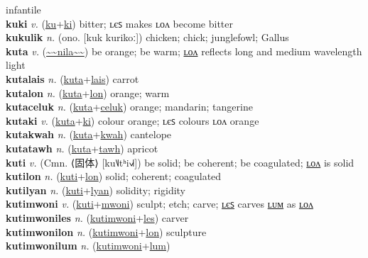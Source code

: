 infantile \label{kukamak} \\
\textbf{kuki} \textit{v.} (\hyperref[ku]{ku}+\hyperref[ki]{ki})
bitter; ʟєꜱ makes ʟᴏᴧ become bitter \label{kuki} \\
\textbf{kukulik} \textit{n.} (ono. [kuk kurikoː])
chicken; chick; junglefowl; Gallus \label{kukulik} \\
\textbf{kuta} \textit{v.} (\hyperref[nila]{\~{}\~{}nila\~{}\~{}})
be orange; be warm; \hyperref[kutalon]{ʟᴏᴧ} reflects long and medium wavelength light \label{kuta} \\
\textbf{kutalais} \textit{n.} (\hyperref[kuta]{kuta}+\hyperref[lais]{lais})
carrot \label{kutalais} \\
\textbf{kutalon} \textit{n.} (\hyperref[kuta]{kuta}+\hyperref[lon]{lon})
orange; warm \label{kutalon} \\
\textbf{kutaceluk} \textit{n.} (\hyperref[kuta]{kuta}+\hyperref[celuk]{celuk})
orange; mandarin; tangerine \label{kutaceluk} \\
\textbf{kutaki} \textit{v.} (\hyperref[kuta]{kuta}+\hyperref[ki]{ki})
colour orange; ʟєꜱ colours ʟᴏᴧ orange \label{kutaki} \\
\textbf{kutakwah} \textit{n.} (\hyperref[kuta]{kuta}+\hyperref[kwah]{kwah})
cantelope \label{kutakwah} \\
\textbf{kutatawh} \textit{n.} (\hyperref[kuta]{kuta}+\hyperref[tawh]{tawh})
apricot \label{kutatawh} \\
\textbf{kuti} \textit{v.} (Cmn. ⟨固体⟩ [ku˥˩tʰi˧˩˧])
be solid; be coherent; be coagulated; \hyperref[kutilon]{ʟᴏᴧ} is solid \label{kuti} \\
\textbf{kutilon} \textit{n.} (\hyperref[kuti]{kuti}+\hyperref[lon]{lon})
solid; coherent; coagulated \label{kutilon} \\
\textbf{kutilyan} \textit{n.} (\hyperref[kuti]{kuti}+\hyperref[lyan]{lyan})
solidity; rigidity \label{kutilyan} \\
\textbf{kutimwoni} \textit{v.} (\hyperref[kuti]{kuti}+\hyperref[mwoni]{mwoni})
sculpt; etch; carve; \hyperref[kutimwoniles]{ʟєꜱ} carves \hyperref[kutimwonilum]{ʟᴜᴍ} as \hyperref[kutimwonilon]{ʟᴏᴧ} \label{kutimwoni} \\
\textbf{kutimwoniles} \textit{n.} (\hyperref[kutimwoni]{kutimwoni}+\hyperref[les]{les})
carver \label{kutimwoniles} \\
\textbf{kutimwonilon} \textit{n.} (\hyperref[kutimwoni]{kutimwoni}+\hyperref[lon]{lon})
sculpture \label{kutimwonilon} \\
\textbf{kutimwonilum} \textit{n.} (\hyperref[kutimwoni]{kutimwoni}+\hyperref[lum]{lum})
